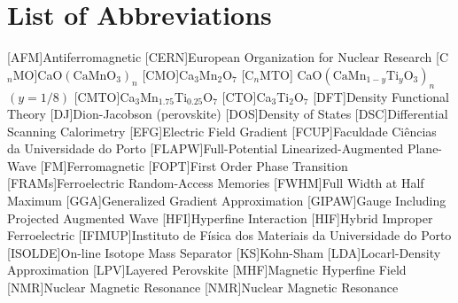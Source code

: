 \chapter*{List of Abbreviations}
\label{chap:abbreviations}

\begin{multicols}{3}[]
	\begin{scriptsize}
        	\begin{acronym}
                    [AFM]{Antiferromagnetic}
                    [CERN]{European Organization for Nuclear Research}
                    [C$_n$MO]{CaO$(\text{CaMnO}_{3})_{n}$}
                    [CMO]{Ca$_{3}$Mn$_{2}$O$_{7}$}
                    [C$_n$MTO]{ CaO$(\text{CaMn}_{1-y}\text{Ti}_{y}\text{O}_{3})_{n}$\\$(y=1/8)$}
                    [CMTO]{Ca$_{3}$Mn$_{1.75}$Ti$_{0.25}$O$_{7}$}
                    [CTO]{Ca$_{3}$Ti$_{2}$O$_{7}$}
                    [DFT]{Density Functional Theory}
                    [DJ]{Dion-Jacobson (perovskite)}                
                    [DOS]{Density of States}
                    [DSC]{Differential Scanning Calorimetry}
                    [EFG]{Electric Field Gradient}
                    [FCUP]{Faculdade Ciências da Universidade do Porto}
                    [FLAPW]{Full-Potential Linearized-Augmented Plane-Wave}
                    [FM]{Ferromagnetic}
                    [FOPT]{First Order Phase Transition}
                    [FRAMs]{Ferroelectric Random-Access Memories}
                    [FWHM]{Full Width at Half Maximum}
                    [GGA]{Generalized Gradient Approximation}
                    [GIPAW]{Gauge Including Projected Augmented Wave}
                    [HFI]{Hyperfine Interaction}
                    [HIF]{Hybrid Improper Ferroelectric}
                    [IFIMUP]{Instituto de Fí\-si\-ca dos Ma\-te\-ri\-ais da U\-ni\-ver\-si\-da\-de do Por\-to}
                    [ISOLDE]{On-line Isotope Mass Separator}
                    [KS]{Kohn-Sham}
                    [LDA]{Locarl-Density Approximation}
                    [LPV]{Layered Perovskite}
                    [MHF]{Magnetic Hyperfine Field}
                    [NMR]{Nuclear Magnetic Resonance}
                    [NMR]{Nuclear Magnetic Resonance}

\end{acronym}
\end{scriptsize}
\end{multicols}
